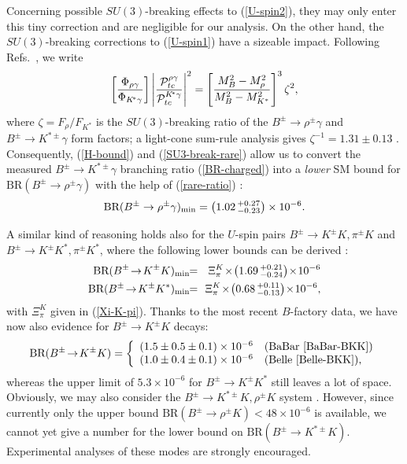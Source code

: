 \documentclass[12pt]{article}
\begin{document}
Concerning possible $SU(3)$-breaking effects to (\ref{U-spin2}), they 
may only enter this tiny correction and are negligible for our analysis. 
On the other hand, the $SU(3)$-breaking corrections to (\ref{U-spin1}) 
have a sizeable impact. Following Refs.~\cite{ALP-rare,BoBu}, we write
\begin{equation}\label{SU3-break-rare}
\left[\frac{\Phi_{\rho\gamma}}{\Phi_{K\!^\ast\gamma}}\right]
\left|\frac{{\cal P}_{tc}^{\rho\gamma}}{{\cal P}_{tc}^{K\!^\ast\gamma}}
\right|^2=\left[\frac{M_B^2-M_\rho^2}{M_B^2-M_{K^\ast}^2}\right]^3
\zeta^2,
\end{equation}
where $\zeta=F_\rho/F_{K^\ast}$ is the $SU(3)$-breaking ratio of the
$B^\pm\to\rho^\pm\gamma$ and $B^\pm\to K^{\ast\pm}\gamma$ form factors; a 
light-cone sum-rule analysis gives $\zeta^{-1}=1.31\pm0.13$ \cite{Ball-Braun}.
Consequently, (\ref{H-bound}) and (\ref{SU3-break-rare}) allow us to convert 
the measured $B^\pm\to K^{\ast\pm}\gamma$ branching ratio (\ref{BR-charged}) 
into a {\it lower} SM bound for 
$\mbox{BR}(B^\pm\to\rho^\pm\gamma)$ with the help of (\ref{rare-ratio}) \cite{FR2}:
\begin{equation}\label{Brhogam-char}
\mbox{BR}(B^\pm\to \rho^\pm\gamma)_{\rm min}=\left(1.02\,^{+0.27}_{-0.23}
\right)\times10^{-6}.
\end{equation}

A similar kind of reasoning holds also for the $U$-spin 
pairs $B^\pm\to K^\pm K, \pi^\pm K$ and $B^\pm\to K^\pm K^\ast, \pi^\pm K^\ast$,
where the following lower bounds can be derived \cite{FR2}:
\begin{eqnarray}
\mbox{BR}(B^\pm\!\to\! K^\pm K)_{\rm min} \!\!&=&\!\! \Xi^K_\pi\!\times\!
\left(1.69\,^{+0.21}_{-0.24}\right)\!\times\! 10^{-6}\label{BKK-char}\\
\mbox{BR}(B^\pm\!\to\! K^\pm K^\ast)_{\rm min} \!\!&=&\!\! \Xi^K_\pi\!\times\!
\left(0.68\,^{+0.11}_{-0.13}
\right)\!\times \! 10^{-6},\label{BpiKast}
\end{eqnarray}
with $\Xi^K_\pi$ given in (\ref{Xi-K-pi}). Thanks to the most recent
$B$-factory data, we have now also evidence for $B^\pm\to K^\pm K$
decays:
\begin{equation}
\mbox{BR}(B^\pm\!\to\! K^\pm K)=
\left\{\begin{array}{ll}
(1.5\pm0.5\pm0.1)\times 10^{-6} & \mbox{(BaBar \cite{BaBar-BKK})}\\
(1.0\pm0.4\pm0.1)\times 10^{-6} & \mbox{(Belle \cite{Belle-BKK}),}
\end{array} \right.
\end{equation}
whereas the upper limit of $5.3\times 10^{-6}$ for $B^\pm\to K^\pm K^\ast$
still leaves a lot of space. Obviously, we may also consider the
$B^\pm\to K^{\ast\pm} K, \rho^\pm K$ system \cite{FR2}. However,
since currently only the upper bound 
$\mbox{BR}(B^\pm\to \rho^\pm K)<48\times 10^{-6}$ is available, 
we cannot yet give a number for the lower bound on 
$\mbox{BR}(B^\pm\to K^{\ast\pm} K)$. Experimental analyses of
these modes are strongly encouraged.
\end{document}

